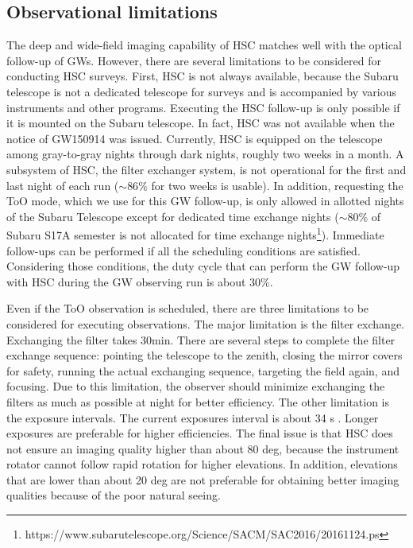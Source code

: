 \documentclass[]{pasj01}
\begin{document}
\begin{appendix}
\section{Observational limitations}\label{limitations}
The deep and wide-field imaging capability of HSC matches well with the optical follow-up of GWs.
However, there are several limitations to be considered for conducting HSC surveys.
First, HSC is not always available, because the Subaru telescope is not a dedicated telescope for surveys and is accompanied by various instruments and other programs. 
Executing the HSC follow-up is only possible if it is mounted on the Subaru telescope.
In fact, HSC was not available when the notice of GW150914 was issued.
Currently, HSC is equipped on the telescope among gray-to-gray nights through dark nights, roughly two weeks in a month.
A subsystem of HSC, the filter exchanger system, is not operational for the first and last night of each run ($\sim 86\%$ for two weeks is usable).
In addition, requesting the ToO mode, which we use for this GW follow-up,
is only allowed in allotted nights of the Subaru Telescope except for dedicated time exchange nights ($\sim 80\%$ of   Subaru S17A semester  is not allocated for time exchange nights\footnote{https://www.subarutelescope.org/Science/SACM/SAC2016/20161124.ps}).
Immediate follow-ups can be performed if all the  scheduling conditions are satisfied.
Considering those conditions, the duty cycle that can perform the GW follow-up with HSC during the GW observing run is about 30\%.

Even if the ToO observation is scheduled, there are three limitations to be considered for executing observations.
The major limitation is the filter exchange. Exchanging the filter takes 30min.
There are several steps to complete the filter exchange sequence: pointing the telescope to the zenith, closing the mirror covers for safety, 
running the actual exchanging sequence, targeting the field again, and focusing.
Due to this limitation, the observer should minimize exchanging the filters as much as possible at night for better efficiency.
The other limitation is the exposure intervals.
The current exposures interval is about 34 s \citep{2012SPIE.8446E..62U}.
Longer exposures are preferable for higher efficiencies.
The final issue is that HSC does not ensure an imaging quality higher than about 80 deg,
because the instrument rotator cannot follow rapid rotation for higher elevations.
In addition,  elevations that are lower than about 20 deg are not preferable for obtaining better imaging qualities because of the poor natural seeing.



\end{appendix}
\end{document}
